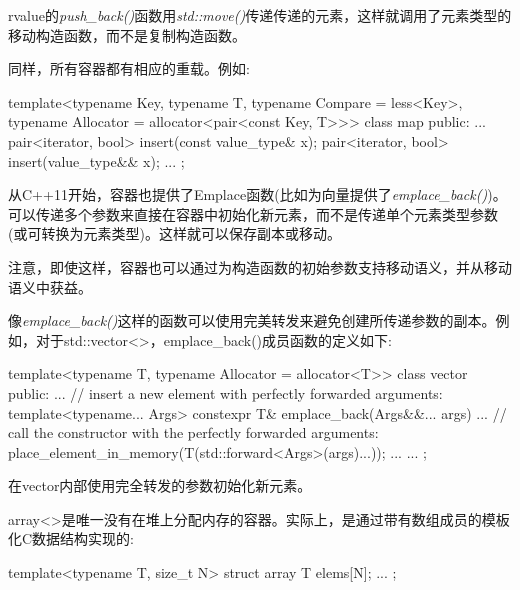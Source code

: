 rvalue的\textit{push\_\allowbreak{}back(\allowbreak{})\allowbreak{}}函数用\textit{std::move()}传递传递的元素，这样就调用了元素类型的移动构造函数，而不是复制构造函数。\par

同样，所有容器都有相应的重载。例如:\par

\begin{codebox}[cpp]
template<typename Key, typename T, typename Compare = less<Key>,
typename Allocator = allocator<pair<const Key, T>>>
class map {
  public:
  ...
  pair<iterator, bool> insert(const value_type& x);
  pair<iterator, bool> insert(value_type&& x);
  ...
};
\end{codebox}


从C++11开始，容器也提供了Emplace函数(比如为向量提供了\textit{emplace\_\allowbreak{}back(\allowbreak{})\allowbreak{}})。可以传递多个参数来直接在容器中初始化新元素，而不是传递单个元素类型参数(或可转换为元素类型)。这样就可以保存副本或移动。\par

注意，即使这样，容器也可以通过为构造函数的初始参数支持移动语义，并从移动语义中获益。\par

像\textit{emplace\_\allowbreak{}back(\allowbreak{})\allowbreak{}}这样的函数可以使用完美转发来避免创建所传递参数的副本。例如，对于std::vector<>，emplace\_back()成员函数的定义如下:\par

\begin{codebox}[cpp]
template<typename T, typename Allocator = allocator<T>>
class vector {
  public:
  ...
  // insert a new element with perfectly forwarded arguments:
  template<typename... Args>
  constexpr T& emplace_back(Args&&... args) {
    ...
    // call the constructor with the perfectly forwarded arguments:
    place_element_in_memory(T(std::forward<Args>(args)...));
    ...
  }
  ...
};
\end{codebox}

在vector内部使用完全转发的参数初始化新元素。\par


array<>是唯一没有在堆上分配内存的容器。实际上，是通过带有数组成员的模板化C数据结构实现的:\par

\begin{codebox}[cpp]
template<typename T, size_t N>
struct array {
  T elems[N];
  ...
};
\end{codebox}

